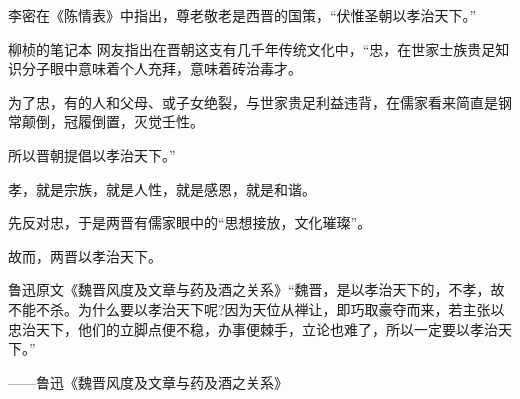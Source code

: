 \begin{zhihuanswer}
李密在《陈情表》中指出，尊老敬老是西晋的国策，``伏惟圣朝以孝治天下。''

柳桢的笔记本
网友指出在晋朝这支有几千年传统文化中，``忠，在世家士族贵足知识分子眼中意味着个人充拜，意味着砖治毒才。

为了忠，有的人和父母、或子女绝裂，与世家贵足利益违背，在儒家看来简直是钢常颠倒，冠履倒置，灭觉壬性。

所以晋朝提倡以孝治天下。''

孝，就是宗族，就是人性，就是感恩，就是和谐。

先反对忠，于是两晋有儒家眼中的``思想接放，文化璀璨''。

故而，两晋以孝治天下。

鲁迅原文《魏晋风度及文章与药及酒之关系》``魏晋，是以孝治天下的，不孝，故不能不杀。为什么要以孝治天下呢?因为天位从禅让，即巧取豪夺而来，若主张以忠治天下，他们的立脚点便不稳，办事便棘手，立论也难了，所以一定要以孝治天下。''

------鲁迅《魏晋风度及文章与药及酒之关系》
\end{zhihuanswer}
